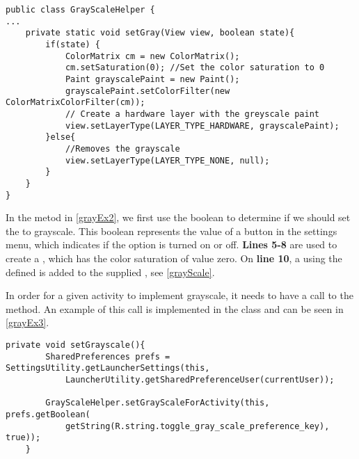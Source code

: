 \begin{minipage}[H]{\linewidth}
\begin{lstlisting}[caption = Method used to change to color saturation of views., label = grayEx2]
public class GrayScaleHelper {
...
    private static void setGray(View view, boolean state){
        if(state) {
            ColorMatrix cm = new ColorMatrix();
            cm.setSaturation(0); //Set the color saturation to 0
            Paint grayscalePaint = new Paint();
            grayscalePaint.setColorFilter(new ColorMatrixColorFilter(cm));
            // Create a hardware layer with the greyscale paint
            view.setLayerType(LAYER_TYPE_HARDWARE, grayscalePaint);
        }else{
            //Removes the grayscale
            view.setLayerType(LAYER_TYPE_NONE, null);
        }
    }
}
\end{lstlisting}
\end{minipage}

In the  metod in \autoref{grayEx2}, we first use the boolean
 to determine if we should set the  to grayscale. This
boolean represents the value of a  button in the settings menu,
which indicates if the option is turned on or off. \textbf{Lines 5-8} are used
to create a , which has the color saturation of value zero. On
\textbf{line 10}, a  using the defined  is
added to the supplied , see \autoref{grayScale}.\nl


In order for a given activity to implement grayscale, it needs to have a call to
the  method. An example of this call is
implemented in the  class and can be seen in
\autoref{grayEx3}.\nl

\begin{minipage}[H]{\linewidth}
\begin{lstlisting}[caption = Setting grayscale by calling the setGrayScaleForActivity method, label = grayEx3] 
private void setGrayscale(){
        SharedPreferences prefs = SettingsUtility.getLauncherSettings(this,
            LauncherUtility.getSharedPreferenceUser(currentUser));

        GrayScaleHelper.setGrayScaleForActivity(this, prefs.getBoolean(
            getString(R.string.toggle_gray_scale_preference_key), true));
    }
\end{lstlisting}
\end{minipage}

